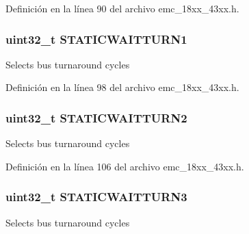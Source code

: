 Definición en la línea 90 del archivo emc\+\_\+18xx\+\_\+43xx.\+h.

\subsubsection[{\texorpdfstring{S\+T\+A\+T\+I\+C\+W\+A\+I\+T\+T\+U\+R\+N1}{STATICWAITTURN1}}]{ uint32\+\_\+t S\+T\+A\+T\+I\+C\+W\+A\+I\+T\+T\+U\+R\+N1}\hypertarget{struct_l_p_c___e_m_c___t_a1e23e7d74f7417bb5f2b8b71672bdc1f}{}\label{struct_l_p_c___e_m_c___t_a1e23e7d74f7417bb5f2b8b71672bdc1f}
Selects bus turnaround cycles 

Definición en la línea 98 del archivo emc\+\_\+18xx\+\_\+43xx.\+h.

\subsubsection[{\texorpdfstring{S\+T\+A\+T\+I\+C\+W\+A\+I\+T\+T\+U\+R\+N2}{STATICWAITTURN2}}]{ uint32\+\_\+t S\+T\+A\+T\+I\+C\+W\+A\+I\+T\+T\+U\+R\+N2}\hypertarget{struct_l_p_c___e_m_c___t_a5279a9288ce31112759990052bf353cc}{}\label{struct_l_p_c___e_m_c___t_a5279a9288ce31112759990052bf353cc}
Selects bus turnaround cycles 

Definición en la línea 106 del archivo emc\+\_\+18xx\+\_\+43xx.\+h.

\subsubsection[{\texorpdfstring{S\+T\+A\+T\+I\+C\+W\+A\+I\+T\+T\+U\+R\+N3}{STATICWAITTURN3}}]{ uint32\+\_\+t S\+T\+A\+T\+I\+C\+W\+A\+I\+T\+T\+U\+R\+N3}\hypertarget{struct_l_p_c___e_m_c___t_a872cc2a94ab59580d107b36f7f558e41}{}\label{struct_l_p_c___e_m_c___t_a872cc2a94ab59580d107b36f7f558e41}
Selects bus turnaround cycles 

